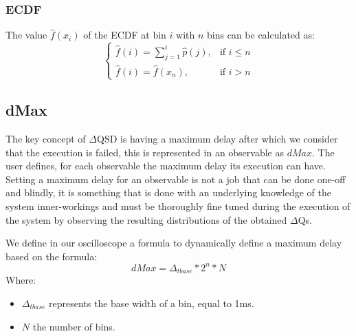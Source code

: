     \subsubsection{ECDF}
    The value $\hat{f}(x_i)$ of the ECDF at bin $i$ with $n$ bins can be calculated as:
    \begin{equation}
        \begin{cases}
            \hat{f}(i) = \sum_{j=1}^{i} \hat{p}(j), & \text{if } i \le n \\  
            \hat{f}(i) = \hat{f}(x_n), & \text{if } i > n 
        \end{cases}
        \label{eq:cdf}
    \end{equation}
    
    \subsection{dMax}
        The key concept of $\Delta$QSD is having a maximum delay after which we consider that the execution is failed, this is represented in an observable as $dMax$. The user defines, for each observable the maximum delay its execution can have. 
Setting a maximum delay for an observable is not a job that can be done one-off and blindly, it is something that is done with an underlying knowledge of the system inner-workings and must be thoroughly fine tuned during the execution of the system by observing the resulting distributions of the obtained $\Delta$Qs. 

We define in our oscilloscope a formula to dynamically define a maximum delay based on the formula:
\begin{equation}
    dMax = \Delta_{t base} * 2^n * N  
    \label{eq:dMax}
\end{equation}
Where:
\begin{itemize}
    \item $\Delta_{t base}$ represents the base width of a bin, equal to 1ms.
    \item $N$ the number of bins.
\end{itemize}

